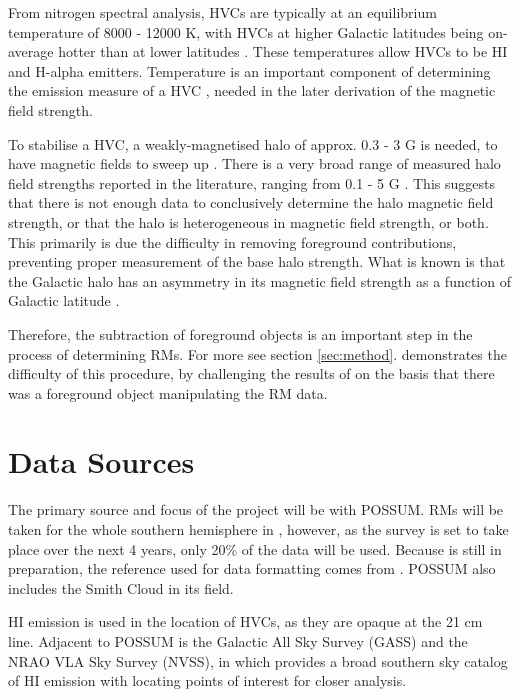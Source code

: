 From nitrogen spectral analysis, HVCs are typically at an equilibrium temperature of 8000 - 12000 K, with HVCs at higher Galactic latitudes being on-average hotter than at lower latitudes \cite{ID48, ID49}. These temperatures allow HVCs to be HI and H-alpha emitters. Temperature is an important component of determining the emission measure of a HVC \cite{ID5, ID26, ID30}, needed in the later derivation of the magnetic field strength.

To stabilise a HVC, a weakly-magnetised halo of approx. 0.3 - 3 {\textmu}G is needed, to have magnetic fields to sweep up \cite{ID13}. There is a very broad range of measured halo field strengths reported in the literature, ranging from 0.1 - 5 {\textmu}G \cite{ID4, ID16, ID21, ID30, ID37, ID42}. This suggests that there is not enough data to conclusively determine the halo magnetic field strength, or that the halo is heterogeneous in magnetic field strength, or both. This primarily is due the difficulty in removing foreground contributions, preventing proper measurement of the base halo strength. What is known is that the Galactic halo has an asymmetry in its magnetic field strength as a function of Galactic latitude \cite{ID16, ID30, ID21}.

Therefore, the subtraction of foreground objects is an important step in the process of determining RMs. For more see section \ref{sec:method}. \citep{ID36} demonstrates the difficulty of this procedure, by challenging the results of \citep{ID2} on the basis that there was a foreground object manipulating the RM data.

\section{Data Sources}
\label{sec:sources}

The primary source and focus of the project will be with POSSUM. RMs will be taken for the whole southern hemisphere in \citep{ID52}, however, as the survey is set to take place over the next 4 years, only 20\% of the data will be used. Because \citep{ID52} is still in preparation, the reference used for data formatting comes from \citep{ID1}. POSSUM also includes the Smith Cloud in its field.

HI emission is used in the location of HVCs, as they are opaque at the 21 cm line. Adjacent to POSSUM is the Galactic All Sky Survey (GASS) and the NRAO VLA Sky Survey (NVSS), in which \citep{ID3, ID6} provides a broad southern sky catalog of HI emission with \citep{ID3} locating points of interest for closer analysis.

